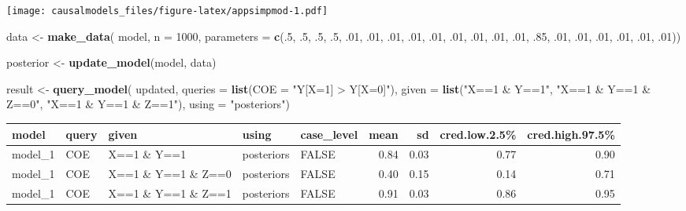 \documentclass[
  12pt,
]{book}
\newenvironment{Shaded}{\begin{snugshade}}{\end{snugshade}}
\newcommand{\AttributeTok}[1]{\textcolor[rgb]{0.13,0.29,0.53}{#1}}
\newcommand{\DecValTok}[1]{\textcolor[rgb]{0.00,0.00,0.81}{#1}}
\newcommand{\FunctionTok}[1]{\textcolor[rgb]{0.13,0.29,0.53}{\textbf{#1}}}
\newcommand{\NormalTok}[1]{#1}
\newcommand{\OtherTok}[1]{\textcolor[rgb]{0.56,0.35,0.01}{#1}}
\newcommand{\StringTok}[1]{\textcolor[rgb]{0.31,0.60,0.02}{#1}}
\begin{document}
\texttt{[image: causalmodels\_files/figure-latex/appsimpmod-1.pdf]}

\begin{Shaded}
\begin{Highlighting}[]
\NormalTok{data }\OtherTok{\textless{}{-}} \FunctionTok{make\_data}\NormalTok{(}
\NormalTok{    model, }\AttributeTok{n =} \DecValTok{1000}\NormalTok{, }
    \AttributeTok{parameters =} \FunctionTok{c}\NormalTok{(.}\DecValTok{5}\NormalTok{, .}\DecValTok{5}\NormalTok{, .}\DecValTok{5}\NormalTok{, .}\DecValTok{5}\NormalTok{, }
\NormalTok{                   .}\DecValTok{01}\NormalTok{, .}\DecValTok{01}\NormalTok{, .}\DecValTok{01}\NormalTok{, .}\DecValTok{01}\NormalTok{, .}\DecValTok{01}\NormalTok{, .}\DecValTok{01}\NormalTok{, .}\DecValTok{01}\NormalTok{, .}\DecValTok{01}\NormalTok{,}
\NormalTok{                   .}\DecValTok{01}\NormalTok{, .}\DecValTok{85}\NormalTok{, .}\DecValTok{01}\NormalTok{, .}\DecValTok{01}\NormalTok{, .}\DecValTok{01}\NormalTok{, .}\DecValTok{01}\NormalTok{, .}\DecValTok{01}\NormalTok{, .}\DecValTok{01}\NormalTok{))}
\end{Highlighting}
\end{Shaded}

\begin{Shaded}
\begin{Highlighting}[]
\NormalTok{posterior }\OtherTok{\textless{}{-}} \FunctionTok{update\_model}\NormalTok{(model, data)}
\end{Highlighting}
\end{Shaded}

\begin{Shaded}
\begin{Highlighting}[]
\NormalTok{result }\OtherTok{\textless{}{-}} \FunctionTok{query\_model}\NormalTok{(}
\NormalTok{    updated, }
    \AttributeTok{queries =} \FunctionTok{list}\NormalTok{(}\AttributeTok{COE =} \StringTok{"Y[X=1] \textgreater{} Y[X=0]"}\NormalTok{), }
    \AttributeTok{given =} \FunctionTok{list}\NormalTok{(}\StringTok{"X==1 \& Y==1"}\NormalTok{, }\StringTok{"X==1 \& Y==1 \& Z==0"}\NormalTok{, }\StringTok{"X==1 \& Y==1 \& Z==1"}\NormalTok{),}
    \AttributeTok{using =} \StringTok{"posteriors"}\NormalTok{)}
\end{Highlighting}
\end{Shaded}

\begin{tabular}{l|l|l|l|l|r|r|r|r}
\hline
model & query & given & using & case\_level & mean & sd & cred.low.2.5\% & cred.high.97.5\%\\
\hline
model\_1 & COE & X==1 \& Y==1 & posteriors & FALSE & 0.84 & 0.03 & 0.77 & 0.90\\
\hline
model\_1 & COE & X==1 \& Y==1 \& Z==0 & posteriors & FALSE & 0.40 & 0.15 & 0.14 & 0.71\\
\hline
model\_1 & COE & X==1 \& Y==1 \& Z==1 & posteriors & FALSE & 0.91 & 0.03 & 0.86 & 0.95\\
\hline
\end{tabular}
\end{document}
